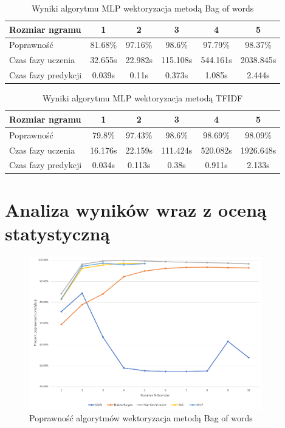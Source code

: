 \begin{table}[H]
    \centering
    \caption{Wyniki algorytmu MLP wektoryzacja metodą Bag of words}
    \begin{tabular}{ | l | c | c | c | c | c |}
        \hline
        Rozmiar ngramu & 1 & 2 & 3 & 4 & 5  \\ \hline
        Poprawność & 81.68\% & 97.16\% & 98.6\% & 97.79\% & 98.37\%   \\ \hline
        Czas fazy uczenia & 32.655s & 22.982s & 115.108s & 544.161s & 2038.845s  \\ \hline
        Czas fazy predykcji & 0.039s & 0.11s & 0.373s & 1.085s & 2.444s  \\ \hline
    \end{tabular}
\end{table}

\begin{table}[H]
    \centering
    \caption{Wyniki algorytmu MLP wektoryzacja metodą TFIDF}
    \begin{tabular}{ | l | c | c | c | c | c |}
        \hline
        Rozmiar ngramu & 1 & 2 & 3 & 4 & 5   \\ \hline
        Poprawność & 79.8\% & 97.43\% & 98.6\% & 98.69\% & 98.09\%   \\ \hline
        Czas fazy uczenia & 16.176s & 22.159s & 111.424s & 520.082s & 1926.648s  \\ \hline
        Czas fazy predykcji & 0.034s & 0.113s & 0.38s & 0.911s & 2.133s  \\ \hline
    \end{tabular}
\end{table}
\section{Analiza wyników wraz z oceną statystyczną}

\begin{figure}[h!]
    \centering
    \includegraphics[width=0.9\textwidth]{./Img/BOWAcc.png}
    \caption{Poprawność algorytmów wektoryzacja metodą Bag of words}
\end{figure}

